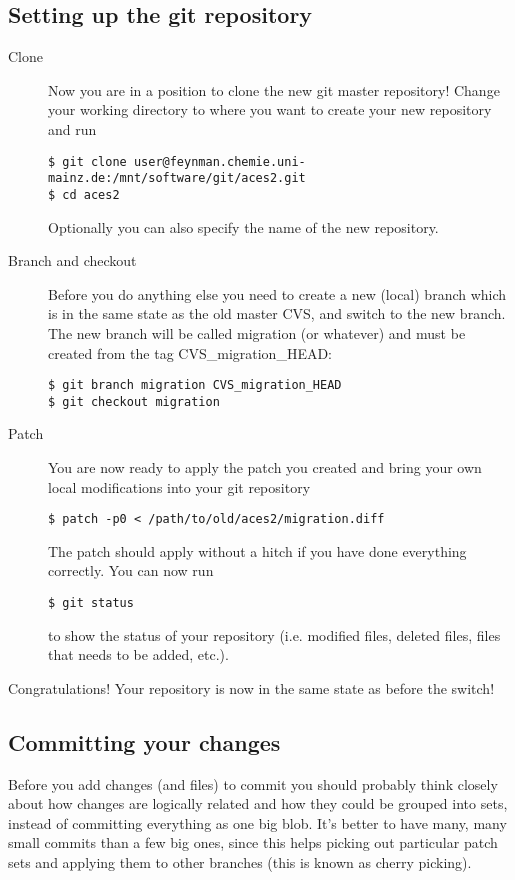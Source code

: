 \documentclass[a4paper,10pt]{article}
\begin{document}
\subsection{Setting up the git repository}
\begin{description}
\item[Clone] Now you are in a position to clone the new git master repository!
Change your working directory to where you want to create your new repository
and run
\begin{verbatim}
$ git clone user@feynman.chemie.uni-mainz.de:/mnt/software/git/aces2.git
$ cd aces2 
\end{verbatim}
Optionally you can also specify the name of the new repository.
\item[Branch and checkout] 
Before you do anything else you need to create a new (local) branch which is
in the same state as the old master CVS, and switch to the new branch. The new
branch will be called migration (or whatever) and must be created from the tag
CVS\_migration\_HEAD:
\begin{verbatim}
$ git branch migration CVS_migration_HEAD
$ git checkout migration
\end{verbatim}
\item[Patch] You are now ready to apply the patch you created and bring your
own local modifications into your git repository
\begin{verbatim}
$ patch -p0 < /path/to/old/aces2/migration.diff
\end{verbatim}
The patch should apply without a hitch if you have done everything correctly.
You can now run 
\begin{verbatim}
$ git status
\end{verbatim}
to show the status of your repository (i.e. modified files, deleted files,
files that needs to be added, etc.).
\end{description}

Congratulations! Your repository is now in the same state as before the 
switch!

\subsection{Committing your changes}
Before you add changes (and files) to
commit you should probably think closely about how changes are logically
related and how they could be grouped into sets, instead of committing
everything as one big blob. It's better to have many, many small commits than
a few big ones, since this helps picking out particular patch sets and
applying them to other branches (this is known as cherry picking).
\end{document}
